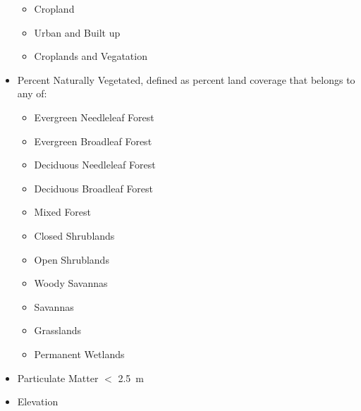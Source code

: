 \documentclass[prl,showpacs,superscriptaddress,twocolumn,longbibliography]{revtex4-1}
\begin{document}
\begin{itemize}
\begin{itemize}
	\item Cropland
	\item Urban and Built up
	\item Croplands and Vegatation\cite{nasa_landcov}
\end{itemize}
\item Percent Naturally Vegetated, defined as percent land coverage that belongs to any of:
\begin{itemize}
	\item Evergreen Needleleaf Forest
	\item Evergreen Broadleaf Forest
	\item Deciduous Needleleaf Forest
	\item Deciduous Broadleaf Forest
	\item Mixed Forest
	\item Closed Shrublands
	\item Open Shrublands
	\item Woody Savannas
	\item Savannas
	\item Grasslands
	\item Permanent Wetlands\cite{nasa_landcov}
\end{itemize}
\item Particulate Matter $<$ 2.5~{\textmu}m \cite{van_donkelaar_global_2016}
\item Elevation\cite{nasa_srtm}
\end{itemize}
\end{document}
